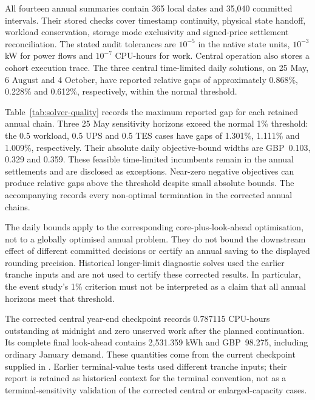 All fourteen annual summaries contain 365 local dates and 35,040 committed intervals. Their stored checks cover timestamp continuity, physical state handoff, workload conservation, storage mode exclusivity and signed-price settlement reconciliation. The stated audit tolerances are $10^{-5}$ in the native state units, $10^{-3}$ kW for power flows and $10^{-7}$ CPU-hours for work. Central operation also stores a cohort execution trace. The three central time-limited daily solutions, on 25 May, 6 August and 4 October, have reported relative gaps of approximately 0.868\%, 0.228\% and 0.612\%, respectively, within the normal threshold.



Table~\ref{tab:solver-quality} records the maximum reported gap for each retained annual chain. Three 25 May sensitivity horizons exceed the normal 1\% threshold: the 0.5 workload, 0.5 UPS and 0.5 TES cases have gaps of 1.301\%, 1.111\% and 1.009\%, respectively. Their absolute daily objective-bound widths are GBP~0.103, 0.329 and 0.359. These feasible time-limited incumbents remain in the annual settlements and are disclosed as exceptions. Near-zero negative objectives can produce relative gaps above the threshold despite small absolute bounds. The accompanying  records every non-optimal termination in the corrected annual chains.

The daily bounds apply to the corresponding core-plus-look-ahead optimisation, not to a globally optimised annual problem. They do not bound the downstream effect of different committed decisions or certify an annual saving to the displayed rounding precision. Historical longer-limit diagnostic solves used the earlier tranche inputs and are not used to certify these corrected results. In particular, the event study's 1\% criterion must not be interpreted as a claim that all annual horizons meet that threshold.

The corrected central year-end checkpoint records 0.787115 CPU-hours outstanding at midnight and zero unserved work after the planned continuation. Its complete final look-ahead contains 2,531.359 kWh and GBP~98.275, including ordinary January demand. These quantities come from the current checkpoint supplied in . Earlier terminal-value tests used different tranche inputs; their report is retained as historical context for the terminal convention, not as a terminal-sensitivity validation of the corrected central or enlarged-capacity cases.

